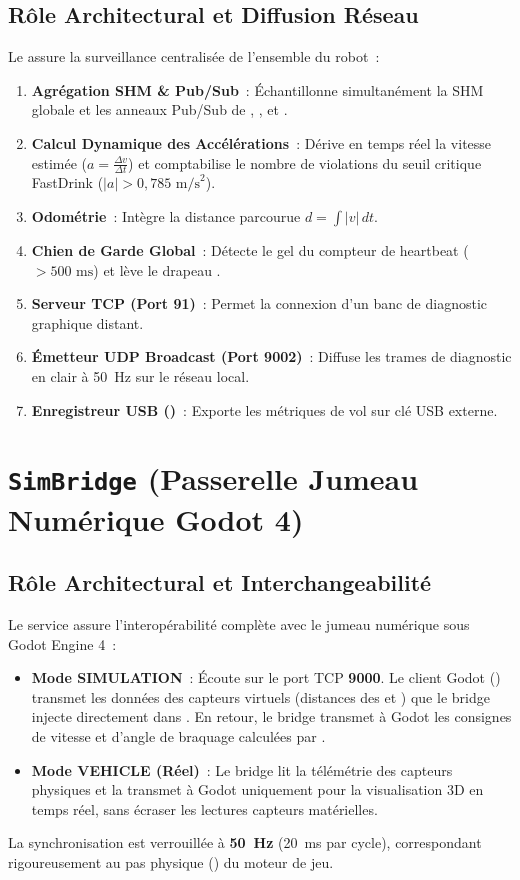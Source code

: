 \subsection{Rôle Architectural et Diffusion Réseau}
Le  assure la surveillance centralisée de l'ensemble du robot~:
\begin{enumerate}
    \item \textbf{Agrégation SHM \& Pub/Sub}~: Échantillonne simultanément la SHM globale et les anneaux Pub/Sub de , ,  et .
    \item \textbf{Calcul Dynamique des Accélérations}~: Dérive en temps réel la vitesse estimée ($a = \frac{\Delta v}{\Delta t}$) et comptabilise le nombre de violations du seuil critique FastDrink ($|a| > 0{,}785\text{ m/s}^2$).
    \item \textbf{Odométrie}~: Intègre la distance parcourue $d = \int |v| \, dt$.
    \item \textbf{Chien de Garde Global}~: Détecte le gel du compteur de heartbeat ($> 500\text{ ms}$) et lève le drapeau .
    \item \textbf{Serveur TCP (Port 91)}~: Permet la connexion d'un banc de diagnostic graphique distant.
    \item \textbf{Émetteur UDP Broadcast (Port 9002)}~: Diffuse les trames de diagnostic en clair à 50~Hz sur le réseau local.
    \item \textbf{Enregistreur USB ()}~: Exporte les métriques de vol sur clé USB externe.
\end{enumerate}

\section{\texorpdfstring{\texttt{SimBridge}}{SimBridge} (Passerelle Jumeau Numérique Godot 4)}

\subsection{Rôle Architectural et Interchangeabilité}
Le service  assure l'interopérabilité complète avec le jumeau numérique sous Godot Engine 4~:
\begin{itemize}
    \item \textbf{Mode SIMULATION}~: Écoute sur le port TCP \textbf{9000}. Le client Godot () transmet les données des capteurs virtuels (distances des  et ) que le bridge injecte directement dans . En retour, le bridge transmet à Godot les consignes de vitesse et d'angle de braquage calculées par .
    \item \textbf{Mode VEHICLE (Réel)}~: Le bridge lit la télémétrie des capteurs physiques et la transmet à Godot uniquement pour la visualisation 3D en temps réel, sans écraser les lectures capteurs matérielles.
\end{itemize}
La synchronisation est verrouillée à \textbf{50~Hz} (20~ms par cycle), correspondant rigoureusement au pas physique () du moteur de jeu.
